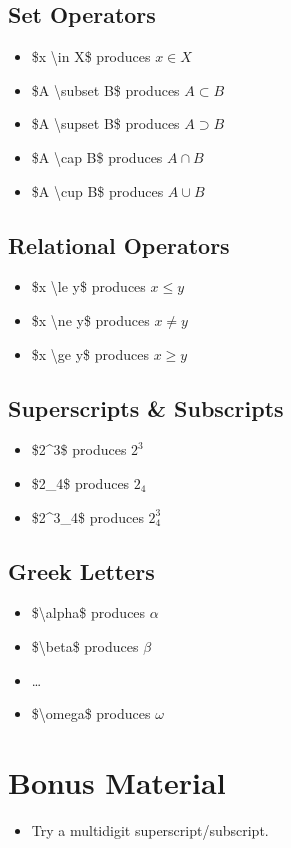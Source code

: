 \documentclass{article}
\begin{document}
\subsection{Set Operators}
\begin{itemize}
	\item \$x \textbackslash{}in X\$ produces $x \in X$
	\item \$A \textbackslash{}subset B\$ produces $A \subset B$
	\item \$A \textbackslash{}supset B\$ produces $A \supset B$
	\item \$A \textbackslash{}cap B\$ produces $A \cap B$
	\item \$A \textbackslash{}cup B\$ produces $A \cup B$
\end{itemize}

\subsection{Relational Operators}
\begin{itemize}
	\item \$x \textbackslash{}le y\$ produces $x \le y$
	\item \$x \textbackslash{}ne y\$ produces $x \ne y$
	\item \$x \textbackslash{}ge y\$ produces $x \ge y$
\end{itemize}

\subsection{Superscripts \& Subscripts}
\begin{itemize}
	\item \$2\^{}3\$ produces $2^3$
	\item \$2\_{}4\$ produces $2_4$
	\item \$2\^{}3\_{}4\$ produces $2^3_4$
\end{itemize}

\subsection{Greek Letters}
\begin{itemize}
	\item \$\textbackslash{}alpha\$ produces $\alpha$
	\item \$\textbackslash{}beta\$ produces $\beta$
	\item \dots
	\item \$\textbackslash{}omega\$ produces $\omega$
\end{itemize}

\section*{Bonus Material}
\begin{itemize}
	\item Try a multidigit superscript/subscript.
\end{itemize}
\end{document}
